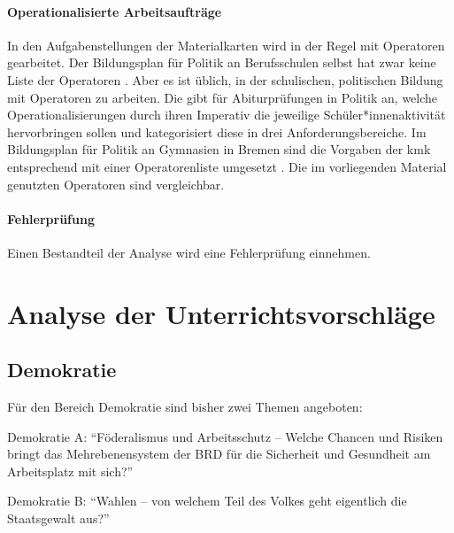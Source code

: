 

\paragraph{Operationalisierte Arbeitsaufträge}
In den Aufgabenstellungen der Materialkarten wird in der Regel mit Operatoren gearbeitet. Der Bildungsplan für Politik an Berufsschulen selbst hat zwar keine Liste der Operatoren \autocite{bplan}. Aber es ist üblich, in der schulischen, politischen Bildung mit Operatoren zu arbeiten. Die \textcite[14-18]{KMK.2005} gibt für Abiturprüfungen in Politik an, welche Operationalisierungen durch ihren Imperativ die jeweilige Schüler*innenaktivität hervorbringen sollen und kategorisiert diese in drei Anforderungsbereiche. Im Bildungsplan für Politik an Gymnasien in Bremen sind die Vorgaben der \gls{kmk} entsprechend mit einer Operatorenliste umgesetzt \autocite[13-14]{lower2008}.
Die im vorliegenden Material genutzten Operatoren sind vergleichbar. 


\paragraph{Fehlerprüfung} 
Einen Bestandteil der Analyse wird eine Fehlerprüfung einnehmen.



\section{Analyse der Unterrichtsvorschläge \label{Analyse}}
\subsection{Demokratie \label{Demokratie}}
Für den Bereich Demokratie sind bisher zwei Themen angeboten:
\begin{myenumerate}
    \item Demokratie A: \enquote{Föderalismus und Arbeitsschutz – Welche Chancen und Risiken bringt das Mehrebenensystem der BRD für die Sicherheit und Gesundheit am Arbeitsplatz mit sich?}
    \item Demokratie B: \enquote{Wahlen – von welchem Teil des Volkes geht eigentlich die Staatsgewalt aus?}
\end{myenumerate}



